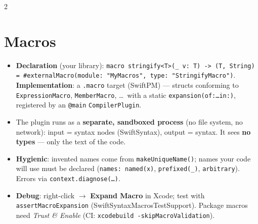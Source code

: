 \documentclass[8pt]{extarticle}
\begin{document}



\begin{multicols}{2}
\raggedright

\section{Macros}
\begin{itemize}
  \item \textbf{Declaration} (your library): \texttt{macro stringify<T>(\_ v: T)
        -> (T, String) = \#externalMacro(module: "MyMacros", type:
        "StringifyMacro")}. \textbf{Implementation}: a \texttt{.macro} target
        (SwiftPM) — structs conforming to \texttt{ExpressionMacro},
        \texttt{MemberMacro}, \dots\ with a static \texttt{expansion(of:\dots in:)},
        registered by an \texttt{@main} \texttt{CompilerPlugin}.
  \item The plugin runs as a \textbf{separate, sandboxed process} (no file
        system, no network): input = syntax nodes (SwiftSyntax), output =
        syntax. It sees \textbf{no types} — only the text of the code.
  \item \textbf{Hygienic}: invented names come from
        \texttt{makeUniqueName()}; names your code will use must be declared
        (\texttt{names: named(x)}, \texttt{prefixed(\_)}, \texttt{arbitrary}).
        Errors via \texttt{context.diagnose(\ldots)}.
  \item \textbf{Debug}: right-click $\to$ \textbf{Expand Macro} in Xcode;
        test with \texttt{assertMacroExpansion} (SwiftSyntaxMacrosTestSupport).
        Package macros need \emph{Trust \& Enable} (CI:
        \texttt{xcodebuild -skipMacroValidation}).
\end{itemize}


\end{multicols}
\end{document}

